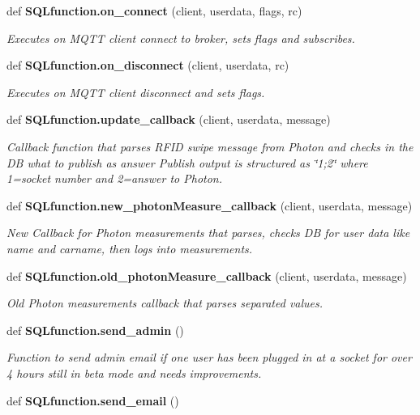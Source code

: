 \begin{DoxyCompactItemize}
\item 
def \textbf{ S\+Q\+Lfunction.\+on\+\_\+connect} (client, userdata, flags, rc)
\begin{DoxyCompactList}\small\item\em Executes on M\+Q\+TT client connect to broker, sets flags and subscribes. \end{DoxyCompactList}\item 
def \textbf{ S\+Q\+Lfunction.\+on\+\_\+disconnect} (client, userdata, rc)
\begin{DoxyCompactList}\small\item\em Executes on M\+Q\+TT client disconnect and sets flags. \end{DoxyCompactList}\item 
def \textbf{ S\+Q\+Lfunction.\+update\+\_\+callback} (client, userdata, message)
\begin{DoxyCompactList}\small\item\em Callback function that parses R\+F\+ID swipe message from Photon and checks in the DB what to publish as answer Publish output is structured as \char`\"{}1;2\char`\"{} where 1=socket number and 2=answer to Photon. \end{DoxyCompactList}\item 
def \textbf{ S\+Q\+Lfunction.\+new\+\_\+photon\+Measure\+\_\+callback} (client, userdata, message)
\begin{DoxyCompactList}\small\item\em New Callback for Photon measurements that parses, checks DB for user data like name and carname, then logs into \textquotesingle{}measurements\textquotesingle{}. \end{DoxyCompactList}\item 
def \textbf{ S\+Q\+Lfunction.\+old\+\_\+photon\+Measure\+\_\+callback} (client, userdata, message)
\begin{DoxyCompactList}\small\item\em Old Photon measurements callback that parses \textquotesingle{}\textquotesingle{} separated values. \end{DoxyCompactList}\item 
def \textbf{ S\+Q\+Lfunction.\+send\+\_\+admin} ()
\begin{DoxyCompactList}\small\item\em Function to send admin email if one user has been plugged in at a socket for over 4 hours still in beta mode and needs improvements. \end{DoxyCompactList}\item 
def \textbf{ S\+Q\+Lfunction.\+send\+\_\+email} ()
\end{DoxyCompactItemize}
